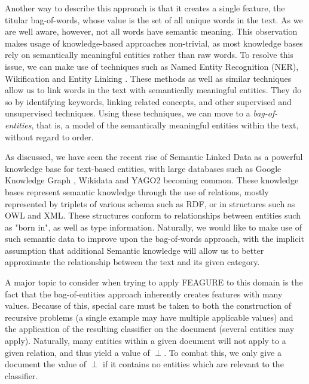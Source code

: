 \documentclass[twoside,11pt]{article}
\theoremstyle{definition}
\begin{document}
Another way to describe this approach is that it creates a single feature, the titular bag-of-words, whose value is the set of all unique words in the text.
As we are well aware, however, not all words have semantic meaning. This observation makes usage of knowledge-based approaches non-trivial, as most knowledge bases rely on semantically meaningful entities rather than raw words.
To resolve this issue, we can make use of techniques such as Named Entity Recognition (NER), Wikification \cite{bunescu2006using} and Entity Linking \cite{rao2013entity}. These methods as well as similar techniques allow us to link words in the text with semantically meaningful entities. They do so by identifying keywords, linking related concepts, and other supervised and unsupervised techniques.
Using these techniques, we can move to a \emph{bag-of-entities}, that is, a model of the semantically meaningful entities within the text, without regard to order.

As discussed, we have seen the recent rise of Semantic Linked Data as a powerful knowledge base for text-based entities, with large databases such as Google Knowledge Graph \cite{pelikanova2014google}, Wikidata \cite{vrandevcic2014wikidata} and YAGO2 \cite{hoffart2013yago2} becoming common. 
These knowledge bases represent semantic knowledge through the use of relations, mostly represented by triplets of various schema such as RDF, or in structures such as OWL and XML. These structures conform to relationships between entities such as "born in", as well as type information.
Naturally, we would like to make use of such semantic data to improve upon the bag-of-words approach, with the implicit assumption that additional Semantic knowledge will allow us to better approximate the relationship between the text and its given category.

A major topic to consider when trying to apply FEAGURE to this domain is the fact that the bag-of-entities approach inherently creates features with many values. Because of this, special care must be taken to both the construction of recursive problems (a single example may have multiple applicable values) and the application of the resulting classifier on the document (several entities may apply).
Naturally, many entities within a given document will not apply to a given relation, and thus yield a value of $\perp$. To combat this, we only give a document the value of $\perp$ if it contains no entities which are relevant to the classifier.


\end{document}
